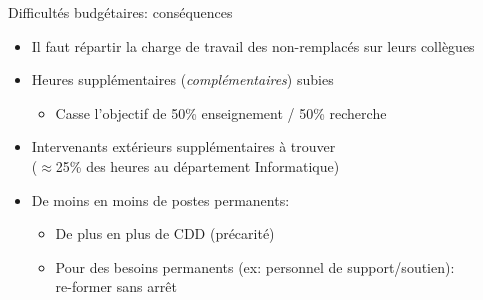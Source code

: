 \documentclass[10pt,final,usepdftitle=false]{beamer}
\begin{document}

\begin{frame}{Difficultés budgétaires: conséquences}
\begin{itemize}
\item Il faut répartir la charge de travail des non-remplacés sur leurs collègues
\item Heures supplémentaires (\textsl{complémentaires}) subies
	\begin{itemize}
	\item Casse l'objectif de 50\% enseignement / 50\% recherche
	\end{itemize}
\item Intervenants extérieurs supplémentaires à trouver\\
	($\approx$25\% des heures au département Informatique)
\item De moins en moins de postes permanents:
\begin{itemize}
\item De plus en plus de CDD (précarité)
\item Pour des besoins permanents (ex: personnel de support/soutien):\\ re-former sans arrêt
\end{itemize}
\end{itemize}
\end{frame}
\end{document}
